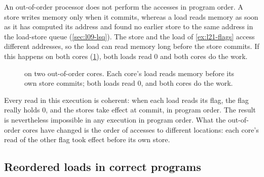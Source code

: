 \documentclass[../main.tex]{subfiles}
\begin{document}
An out-of-order processor does not perform the accesses in program order.  A
store writes memory only when it commits, whereas a load reads memory as soon
as it has computed its address and found no earlier store to the same address
in the load-store queue (\cref{sec:l09-lsq}).  The store and the load of
\cref{ex:l21-flags} access different addresses, so the load can read memory
long before the store commits.  If this happens on both cores
(\cref{fig:l21-reorder}), both loads read 0 and both cores do the work.

\begin{figure}[htbp]
  \centering
  
  \caption{ on two out-of-order cores.  Each core's load
    reads memory before its own store commits; both loads read 0, and both
    cores do the work.}
  \label{fig:l21-reorder}
\end{figure}

Every read in this execution is coherent: when each load reads its flag, the
flag really holds 0, and the stores take effect at commit, in program
order.
The result is nevertheless impossible in any execution in program order.  What
the out-of-order cores have changed is the order of accesses to different
locations: each core's read of the other flag took effect before its own
store.

\subsection{Reordered loads in correct programs}
\label{sec:l21-ready}
\end{document}
